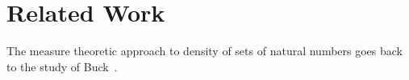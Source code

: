 \section{Related Work}

The measure theoretic approach to density of sets of natural numbers goes
back to the study of Buck~\cite{Buck}.